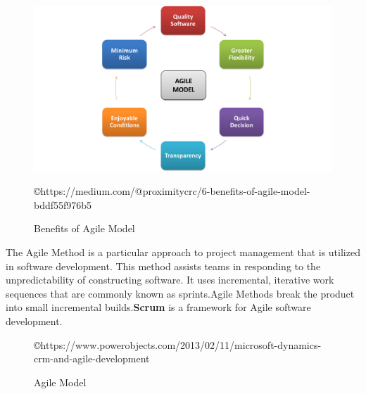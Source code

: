 \documentclass[11pt,fleqn]{book} %
\begin{document}
\begin{figure}[h]
    \centering
    \includegraphics[scale=0.25]{Pictures/agile.png}
    \caption{Benefits of Agile Model}
    \copyright{https://medium.com/@proximitycrc/6-benefits-of-agile-model-bddf55f976b5}
    \label{fig:benefits of agile model}
\end{figure}
The Agile Method is a particular approach to project management that is utilized in software development. This method assists teams in responding to the unpredictability of constructing software. It uses incremental, iterative work sequences that are commonly known as sprints.Agile Methods break the product into small incremental builds.\textbf{Scrum} is a framework for Agile software development.

 \begin{center}
	\begin{figure}[h]
		\centering
	  \caption{Agile Model}
	  \copyright{https://www.powerobjects.com/2013/02/11/microsoft-dynamics-crm-and-agile-development}
	  \label{fig:Agile}
	\end{figure}
\end{center}
\end{document}
